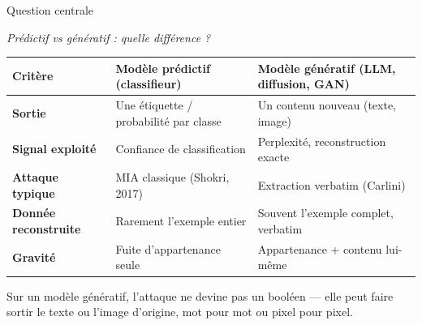 \documentclass[aspectratio=169, 10pt, table]{beamer}
\newcommand{\subtitleline}[1]{{\small\itshape\color{TSPcyan}#1\par}\vspace{0.2cm}}
\begin{document}
\begin{frame}{Question centrale}
    \subtitleline{Prédictif vs génératif : quelle différence ?}
    
    \begin{table}
        \renewcommand{\arraystretch}{1.4}
        \small
        \begin{tabularx}{\textwidth}{>{\bfseries}l >{\raggedright\arraybackslash}X >{\raggedright\arraybackslash}X}
            \toprule
            \rowcolor{TSPblue}\color{white}\textbf{\footnotesize Critère} & \color{white}\textbf{\footnotesize Modèle prédictif (classifieur)} & \color{white}\textbf{\footnotesize Modèle génératif (LLM, diffusion, GAN)} \\
            \midrule
            Sortie & Une étiquette / probabilité par classe & Un contenu nouveau (texte, image) \\
            Signal exploité & Confiance de classification & Perplexité, reconstruction exacte \\
            Attaque typique & MIA classique (Shokri, 2017) & Extraction verbatim (Carlini) \\
            Donnée reconstruite & Rarement l'exemple entier & Souvent l'exemple complet, verbatim \\
            Gravité & Fuite d'appartenance seule & Appartenance + contenu lui-même \\
            \bottomrule
        \end{tabularx}
    \end{table}
    
    \vspace{0.2cm}
    Sur un modèle génératif, l'attaque ne devine pas un booléen — elle peut faire sortir le texte ou l'image d'origine, mot pour mot ou pixel pour pixel.
\end{frame}
\end{document}
